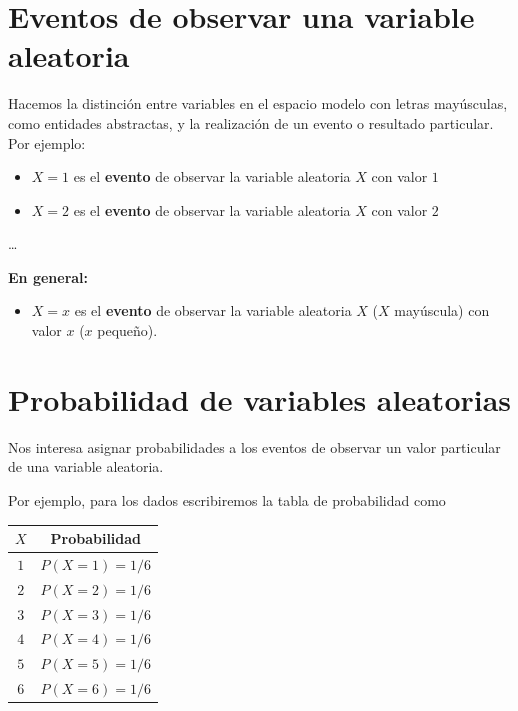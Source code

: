 \documentclass[
]{book}
\providecommand{\tightlist}{%
  \setlength{\itemsep}{0pt}\setlength{\parskip}{0pt}}
\begin{document}
\hypertarget{eventos-de-observar-una-variable-aleatoria}{%
\section{Eventos de observar una variable aleatoria}\label{eventos-de-observar-una-variable-aleatoria}}

Hacemos la distinción entre variables en el espacio modelo con letras mayúsculas, como entidades abstractas, y la realización de un evento o resultado particular. Por ejemplo:

\begin{itemize}
\tightlist
\item
  \(X=1\) es el \textbf{evento} de observar la variable aleatoria \(X\) con valor \(1\)
\item
  \(X=2\) es el \textbf{evento} de observar la variable aleatoria \(X\) con valor \(2\)
\end{itemize}

\ldots{}

\textbf{En general:}

\begin{itemize}
\tightlist
\item
  \(X=x\) es el \textbf{evento} de observar la variable aleatoria \(X\) (\(X\) mayúscula) con valor \(x\) (\(x\) pequeño).
\end{itemize}

\hypertarget{probabilidad-de-variables-aleatorias}{%
\section{Probabilidad de variables aleatorias}\label{probabilidad-de-variables-aleatorias}}

Nos interesa asignar probabilidades a los eventos de observar un valor particular de una variable aleatoria.

Por ejemplo, para los dados escribiremos la tabla de probabilidad como

\begin{longtable}[]{@{}cc@{}}
\toprule\noalign{}
\(X\) & Probabilidad \\
\midrule\noalign{}
\endhead
\bottomrule\noalign{}
\endlastfoot
\(1\) & \(P(X=1)=1/6\) \\
\(2\) & \(P(X=2)=1/6\) \\
\(3\) & \(P(X=3)=1/6\) \\
\(4\) & \(P(X=4)=1/6\) \\
\(5\) & \(P(X=5)=1/6\) \\
\(6\) & \(P(X=6)=1/6\) \\
\end{longtable}
\end{document}
